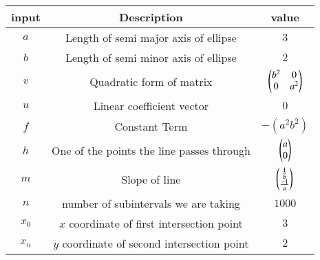 \begin{tabular}[10pt]{ |c| c| c|}
    \hline
    \textbf{input}&\textbf{Description}&\textbf{value}\\
    \hline 
    $a$&Length of semi major axis of ellipse&$3$\\
    \hline
    $b$&Length of semi minor axis of ellipse&$2$\\
    \hline
    $v$&Quadratic form of matrix&$\begin{pmatrix}b^2&0\\0&a^2\end{pmatrix}$\\
    \hline 
    $u$&Linear coefficient vector&$0$\\
    \hline 
    $f$&Constant Term&$-(a^2b^2)$\\
    \hline
    $h$&One of the points the line passes through&$\begin{pmatrix}a\\0\end{pmatrix}$\\
    \hline
    $m$&Slope of line&$\begin{pmatrix}\frac{1}{b}\\\frac{-1}{a}\end{pmatrix}$\\
    \hline
    $n$& number of subintervals we are taking & $1000$\\
    \hline
    $x_0$&$x$ coordinate of first intersection point& $3$\\
    \hline
    $x_n$& $y$ coordinate of second intersection point& $2$\\
    \hline
    \end{tabular}
